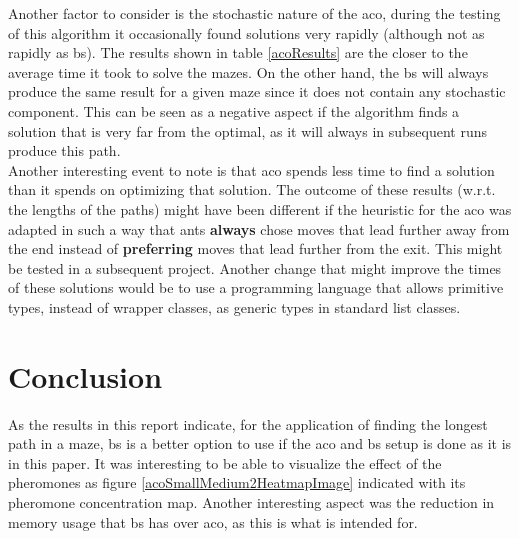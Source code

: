 \documentclass[hidelinks,english,conference]{IEEEtran}
\begin{document}
    Another factor to consider is the stochastic nature of the \gls{aco}, during the testing of this algorithm it occasionally found solutions very rapidly (although not as rapidly as \gls{bs}). The results shown in table \ref{acoResults} are the closer to the average time it took to solve the mazes. On the other hand, the \gls{bs} will always produce the same result for a given maze since it does not contain any stochastic component. This can be seen as a negative aspect if the algorithm finds a solution that is very far from the optimal, as it will always in subsequent runs produce this path.\\
    
    Another interesting event to note is that \gls{aco} spends less time to find a solution than it spends on optimizing that solution. The outcome of these results (w.r.t. the lengths of the paths) might have been different if the heuristic for the \gls{aco} was adapted in such a way that ants \textbf{always} chose moves that lead further away from the end instead of \textbf{preferring} moves that lead further from the exit. This might be tested in a subsequent project. Another change that might improve the times of these solutions would be to use a programming language that allows primitive types, instead of wrapper classes, as generic types in standard list classes.\\
    
\section{Conclusion}
	As the results in this report indicate, for the application of finding the longest path in a maze, \gls{bs} is a better option to use if the \gls{aco} and \gls{bs} setup is done as it is in this paper. It was interesting to be able to visualize the effect of the pheromones as figure \ref{acoSmallMedium2HeatmapImage} indicated with its pheromone concentration map. Another interesting aspect was the reduction in memory usage that \gls{bs} has over \gls{aco}, as this is what is intended for.



\end{document}
